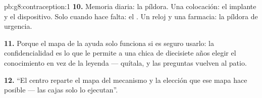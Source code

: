 \begin{solution}{pb:g8:contraception:1}
\textbf{10.} Memoria diaria: la píldora. Una colocación: el implante y
el dispositivo. Solo cuando hace falta: el . Un reloj y una
farmacia: la píldora de urgencia.

\textbf{11.} Porque el mapa de la ayuda solo funciona si es seguro
usarlo: la confidencialidad es lo que le permite a una chica de
diecisiete años elegir el conocimiento en vez de la leyenda ---
quítala, y las preguntas vuelven al patio.

\textbf{12.} ``El centro reparte el mapa del mecanismo y la elección
que ese mapa hace posible --- las cajas solo lo ejecutan''.
\end{solution}
